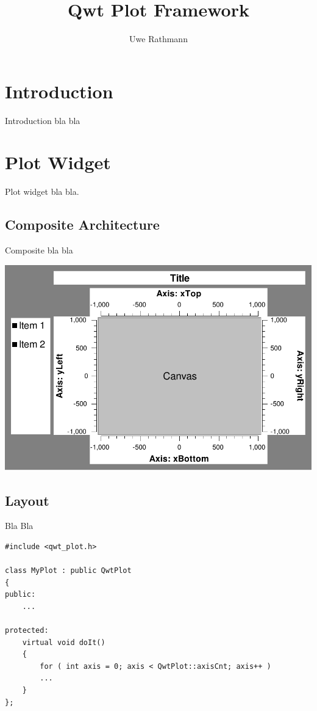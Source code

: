 \documentclass[12pt,a4paper]{book}
\author{Uwe Rathmann}
\title{Qwt Plot Framework}
\begin{document}
\maketitle
\pagestyle{headings}

\tableofcontents

\chapter{Introduction}

Introduction bla bla

\chapter{Plot Widget}

Plot widget bla bla.

\section{Composite Architecture}

Composite bla bla

\includegraphics[scale=1.0]{plotlayout.pdf}

\section{Layout}

Bla Bla 

\begin{lstlisting}
#include <qwt_plot.h>

class MyPlot : public QwtPlot
{
public:
    ...
	
protected:
    virtual void doIt()
    {
        for ( int axis = 0; axis < QwtPlot::axisCnt; axis++ )
        ...
    }
};
\end{lstlisting}
\end{document}
